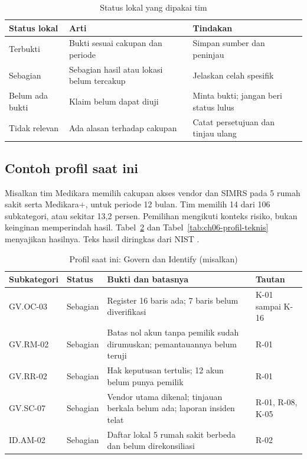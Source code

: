 \begin{table}[!htb]
  \centering\small
  \caption{Status lokal yang dipakai tim}\label{tab:ch06-profil}
  \begin{tabularx}{\textwidth}{|>{\raggedright\arraybackslash}p{}|>{\raggedright\arraybackslash}X|>{\raggedright\arraybackslash}X|}
    \hline
    \textbf{Status lokal} & \textbf{Arti} & \textbf{Tindakan} \\ \hline
    Terbukti & Bukti sesuai cakupan dan periode & Simpan sumber dan peninjau \\ \hline
    Sebagian & Sebagian hasil atau lokasi belum tercakup & Jelaskan celah spesifik \\ \hline
    Belum ada bukti & Klaim belum dapat diuji & Minta bukti; jangan beri status lulus \\ \hline
    Tidak relevan & Ada alasan terhadap cakupan & Catat persetujuan dan tinjau ulang \\ \hline
  \end{tabularx}
\end{table}

\subsection*{Contoh profil saat ini}

Misalkan tim Medikara memilih cakupan akses vendor dan SIMRS pada 5 rumah sakit serta Medikara+,
untuk periode 12 bulan. Tim memilih 14 dari 106 subkategori, atau sekitar 13,2 persen. Pemilihan
mengikuti konteks risiko, bukan keinginan memperindah hasil. Tabel~\ref{tab:ch06-profil-tata-kelola}
dan Tabel~\ref{tab:ch06-profil-teknis} menyajikan hasilnya. Teks hasil diringkas dari NIST
\cite{nistcsf2}.

\begin{table}[!htb]
  \centering\small
  \caption{Profil saat ini: Govern dan Identify (misalkan)}\label{tab:ch06-profil-tata-kelola}
  \begin{tabularx}{\textwidth}{|>{\raggedright\arraybackslash}p{}|>{\raggedright\arraybackslash}p{}|>{\raggedright\arraybackslash}X|>{\raggedright\arraybackslash}p{}|}
    \hline
    \textbf{Subkategori} & \textbf{Status} & \textbf{Bukti dan batasnya} & \textbf{Tautan} \\ \hline
    GV.OC-03 & Sebagian & Register 16 baris ada; 7 baris belum diverifikasi & K-01 sampai K-16 \\
    \hline
    GV.RM-02 & Sebagian & Batas nol akun tanpa pemilik sudah dirumuskan; pemantauannya belum teruji &
    R-01 \\ \hline
    GV.RR-02 & Sebagian & Hak keputusan tertulis; 12 akun belum punya pemilik & R-01 \\ \hline
    GV.SC-07 & Sebagian & Vendor utama dikenal; tinjauan berkala belum ada; laporan insiden telat &
    R-01, R-08, K-05 \\ \hline
    ID.AM-02 & Sebagian & Daftar lokal 5 rumah sakit berbeda dan belum direkonsiliasi & R-02 \\ \hline
  \end{tabularx}
\end{table}

